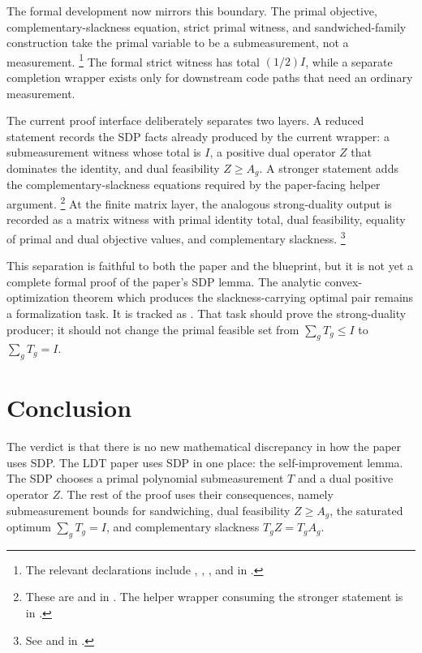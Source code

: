\documentclass[11pt]{article}
\begin{document}
The formal development now mirrors this boundary.  The primal objective,
complementary-slackness equation, strict primal witness, and sandwiched-family
construction take the primal variable to be a submeasurement, not a measurement.%
\footnote{The relevant declarations include
,
, , and
 in
.}
The formal strict witness has total $(1/2)I$, while a separate completion wrapper
exists only for downstream code paths that need an ordinary measurement.

The current proof interface deliberately separates two layers.  A reduced
statement records the SDP facts already produced by the current wrapper: a
submeasurement witness whose total is $I$, a positive dual operator $Z$ that
dominates the identity, and dual feasibility $Z\ge A_g$.  A stronger statement
adds the complementary-slackness equations required by the paper-facing helper
argument.%
\footnote{These are
 and
 in
.  The helper
wrapper consuming the stronger statement is
 in
.}
At the finite matrix layer, the analogous strong-duality output is recorded as a
matrix witness with primal identity total, dual feasibility, equality of primal
and dual objective values, and complementary slackness.%
\footnote{See
 and
 in
.}

This separation is faithful to both the paper and the blueprint, but it is not
yet a complete formal proof of the paper's SDP lemma.  The analytic
convex-optimization theorem which produces the slackness-carrying optimal pair
remains a formalization task.  It is tracked as .  That task
should prove the strong-duality producer; it should not change the primal
feasible set from $\sum_gT_g\le I$ to $\sum_gT_g=I$.

\section{Conclusion}

The verdict is that there is no new mathematical discrepancy in how the paper
uses SDP.  The LDT paper uses SDP in one place: the self-improvement lemma.  The
SDP chooses a primal polynomial submeasurement $T$ and a dual positive operator
$Z$.  The rest of the proof uses their consequences, namely submeasurement
bounds for sandwiching, dual feasibility $Z\ge A_g$, the saturated optimum
$\sum_gT_g=I$, and complementary slackness $T_gZ=T_gA_g$.
\end{document}
